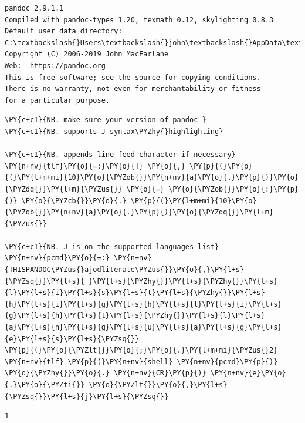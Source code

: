     \begin{Verbatim}[commandchars=\\\{\}]
pandoc 2.9.1.1
Compiled with pandoc-types 1.20, texmath 0.12, skylighting 0.8.3
Default user data directory: C:\textbackslash{}Users\textbackslash{}john\textbackslash{}AppData\textbackslash{}Roaming\textbackslash{}pandoc
Copyright (C) 2006-2019 John MacFarlane
Web:  https://pandoc.org
This is free software; see the source for copying conditions.
There is no warranty, not even for merchantability or fitness
for a particular purpose.

    \end{Verbatim}

    \begin{tcolorbox}[breakable, size=fbox, boxrule=1pt, pad at break*=1mm,colback=cellbackground, colframe=cellborder]
\begin{Verbatim}[commandchars=\\\{\}]
\PY{c+c1}{NB. make sure your version of pandoc }
\PY{c+c1}{NB. supports J syntax\PYZhy{}highlighting}

\PY{c+c1}{NB. appends line feed character if necessary}
\PY{n+nv}{tlf}\PY{o}{=:}\PY{o}{]} \PY{o}{,} \PY{p}{(}\PY{p}{(}\PY{l+m+mi}{10}\PY{o}{\PYZob{}}\PY{n+nv}{a}\PY{o}{.}\PY{p}{)}\PY{o}{\PYZdq{}}\PY{l+m}{\PYZus{}} \PY{o}{=} \PY{o}{\PYZob{}}\PY{o}{:}\PY{p}{)} \PY{o}{\PYZcb{}}\PY{o}{.} \PY{p}{(}\PY{l+m+mi}{10}\PY{o}{\PYZob{}}\PY{n+nv}{a}\PY{o}{.}\PY{p}{)}\PY{o}{\PYZdq{}}\PY{l+m}{\PYZus{}}

\PY{c+c1}{NB. J is on the supported languages list}
\PY{n+nv}{pcmd}\PY{o}{=:} \PY{n+nv}{THISPANDOC\PYZus{}ajodliterate\PYZus{}}\PY{o}{,}\PY{l+s}{\PYZsq{}}\PY{l+s}{ }\PY{l+s}{\PYZhy{}}\PY{l+s}{\PYZhy{}}\PY{l+s}{l}\PY{l+s}{i}\PY{l+s}{s}\PY{l+s}{t}\PY{l+s}{\PYZhy{}}\PY{l+s}{h}\PY{l+s}{i}\PY{l+s}{g}\PY{l+s}{h}\PY{l+s}{l}\PY{l+s}{i}\PY{l+s}{g}\PY{l+s}{h}\PY{l+s}{t}\PY{l+s}{\PYZhy{}}\PY{l+s}{l}\PY{l+s}{a}\PY{l+s}{n}\PY{l+s}{g}\PY{l+s}{u}\PY{l+s}{a}\PY{l+s}{g}\PY{l+s}{e}\PY{l+s}{s}\PY{l+s}{\PYZsq{}}
\PY{p}{(}\PY{o}{\PYZlt{}}\PY{o}{;}\PY{o}{.}\PY{l+m+mi}{\PYZus{}2} \PY{n+nv}{tlf} \PY{p}{(}\PY{n+nv}{shell} \PY{n+nv}{pcmd}\PY{p}{)} \PY{o}{\PYZhy{}}\PY{o}{.} \PY{n+nv}{CR}\PY{p}{)} \PY{n+nv}{e}\PY{o}{.}\PY{o}{\PYZti{}} \PY{o}{\PYZlt{}}\PY{o}{,}\PY{l+s}{\PYZsq{}}\PY{l+s}{j}\PY{l+s}{\PYZsq{}}
\end{Verbatim}
\end{tcolorbox}

    \begin{Verbatim}[commandchars=\\\{\}]
1
    \end{Verbatim}


